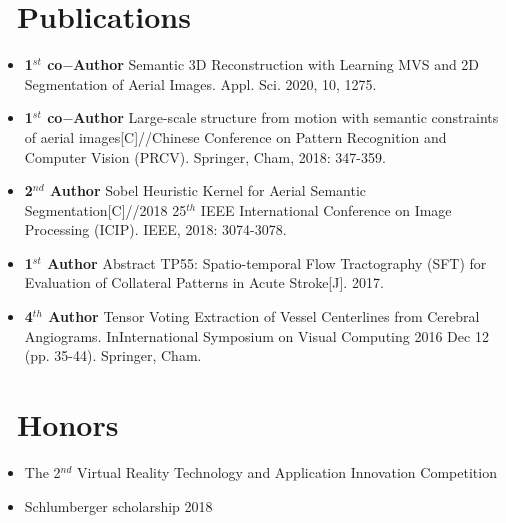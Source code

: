 \documentclass{resume}
\begin{document}
\section{\faBookmark\ Publications}
\begin{itemize} \small
    \item \textbf{1$^{st}$ co$-$Author} Semantic 3D Reconstruction with Learning MVS and 2D Segmentation of Aerial Images. Appl. Sci. 2020, 10, 1275. 
    \item \textbf{1$^{st}$ co$-$Author} Large-scale structure from motion with semantic constraints of aerial images[C]//Chinese Conference on Pattern Recognition and Computer Vision (PRCV). Springer, Cham, 2018: 347-359.
	\item \textbf{2$^{nd}$ Author} Sobel Heuristic Kernel for Aerial Semantic Segmentation[C]//2018 25$^{th}$ IEEE International Conference on Image Processing (ICIP). IEEE, 2018: 3074-3078.
	\item \textbf{1$^{st}$ Author} Abstract TP55: Spatio-temporal Flow Tractography (SFT) for Evaluation of Collateral Patterns in Acute Stroke[J]. 2017.
	\item \textbf{4$^{th}$ Author} Tensor Voting Extraction of Vessel Centerlines from Cerebral Angiograms. InInternational Symposium on Visual Computing 2016 Dec 12 (pp. 35-44). Springer, Cham.
\end{itemize}


\section{\faHeartO\ Honors}

\begin{itemize}
	\item The 2$^{nd}$ Virtual Reality Technology and Application Innovation Competition
\end{itemize}

\begin{itemize}
	\item Schlumberger scholarship 2018
\end{itemize}

\end{document}
